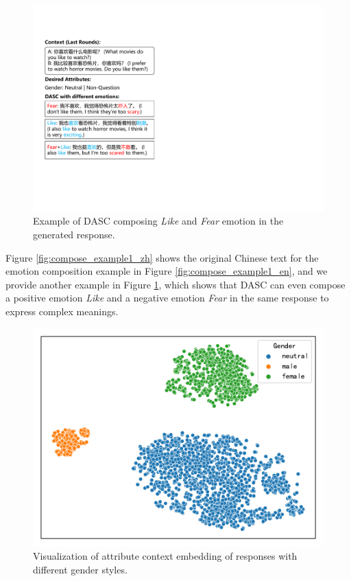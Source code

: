 \begin{figure}[ht]
    \centering
    \includegraphics[width=1.0\columnwidth]{figures/compose_example2.pdf}
    \caption{Example of DASC composing \textit{Like} and \textit{Fear} emotion in the generated response.}
    \label{fig:compose_example2}
\end{figure}

Figure \ref{fig:compose_example1_zh} shows the original Chinese text for the emotion composition example in Figure \ref{fig:compose_example1_en}, and we provide another example in Figure \ref{fig:compose_example2}, which shows that DASC can even compose a positive emotion \textit{Like} and a negative emotion \textit{Fear} in the same response to express complex meanings. 

\begin{figure}[ht]
    \centering
    \includegraphics[width=1.0\columnwidth]{figures/gender_context_emb.pdf}
    \caption{Visualization of attribute context embedding of responses with different gender styles.}
    \label{fig:gender_context_emb}
\end{figure}

